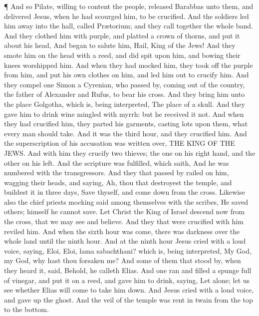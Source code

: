  ¶ And so Pilate, willing to content the people, released
Barabbas unto them, and delivered Jesus, when he had scourged him, to be
crucified.  And the soldiers led him away into the hall,
called Prætorium; and they call together the whole band. 
And they clothed him with purple, and platted a crown of thorns, and put
it about his head,  And began to salute him, Hail, King of
the Jews!  And they smote him on the head with a reed, and
did spit upon him, and bowing their knees worshipped him. 
And when they had mocked him, they took off the purple from him, and put
his own clothes on him, and led him out to crucify him. 
And they compel one Simon a Cyrenian, who passed by, coming out of the
country, the father of Alexander and Rufus, to bear his cross.
 And they bring him unto the place Golgotha, which is,
being interpreted, The place of a skull.  And they gave him
to drink wine mingled with myrrh: but he received it not. 
And when they had crucified him, they parted his garments, casting lots
upon them, what every man should take.  And it was the
third hour, and they crucified him.  And the superscription
of his accusation was written over, THE KING OF THE JEWS. 
And with him they crucify two thieves; the one on his right hand, and
the other on his left.  And the scripture was fulfilled,
which saith, And he was numbered with the transgressors. 
And they that passed by railed on him, wagging their heads, and saying,
Ah, thou that destroyest the temple, and buildest it in three days,
 Save thyself, and come down from the cross. 
Likewise also the chief priests mocking said among themselves with the
scribes, He saved others; himself he cannot save.  Let
Christ the King of Israel descend now from the cross, that we may see
and believe. And they that were crucified with him reviled him.
 And when the sixth hour was come, there was darkness over
the whole land until the ninth hour.  And at the ninth hour
Jesus cried with a loud voice, saying, Eloi, Eloi, lama sabachthani?
which is, being interpreted, My God, my God, why hast thou forsaken me?
 And some of them that stood by, when they heard it, said,
Behold, he calleth Elias.  And one ran and filled a spunge
full of vinegar, and put it on a reed, and gave him to drink, saying,
Let alone; let us see whether Elias will come to take him down.
 And Jesus cried with a loud voice, and gave up the ghost.
 And the veil of the temple was rent in twain from the top
to the bottom.

